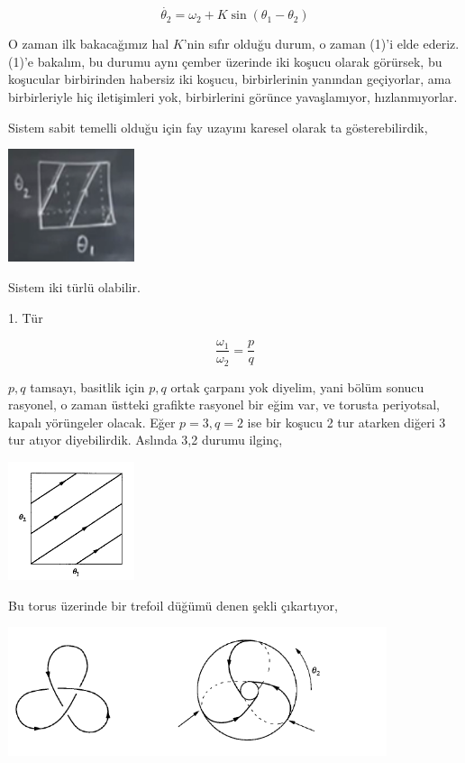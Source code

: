 \documentclass[12pt,fleqn]{article}\usepackage{../../common}
\begin{document}
$$ \dot{\theta_2} = \omega_2 + K \sin(\theta_1-\theta_2)$$

O zaman ilk bakacağımız hal $K$'nin sıfır olduğu durum, o zaman (1)'i elde
ederiz. (1)'e bakalım, bu durumu aynı çember üzerinde iki koşucu olarak
görürsek, bu koşucular birbirinden habersiz iki koşucu, birbirlerinin
yanından geçiyorlar, ama birbirleriyle hiç iletişimleri yok, birbirlerini
görünce yavaşlamıyor, hızlanmıyorlar. 

Sistem sabit temelli olduğu için fay uzayını karesel olarak ta gösterebilirdik,

\includegraphics[width=10em]{14_22.png}

Sistem iki türlü olabilir. 

1. Tür

$$ \frac{\omega_1}{\omega_2} = \frac{p}{q}$$

$p,q$ tamsayı, basitlik için $p,q$ ortak çarpanı yok diyelim, yani bölüm
sonucu rasyonel, o zaman üstteki grafikte rasyonel bir eğim var, ve torusta
periyotsal, kapalı yörüngeler olacak. Eğer $p=3,q=2$ ise bir koşucu 2 tur
atarken diğeri 3 tur atıyor diyebilirdik. Aslında 3,2 durumu ilginç, 

\includegraphics[width=10em]{14_23.png}

Bu torus üzerinde bir trefoil düğümü denen şekli çıkartıyor, 

\includegraphics[width=30em]{14_24.png}
\end{document}

